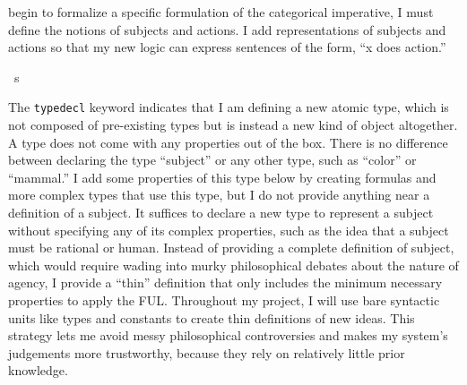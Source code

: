 \begin{isabellebody}
\begin{isamarkuptext}
begin to formalize a specific formulation of the categorical imperative, I must define the notions of 
subjects and actions. I add representations of subjects and actions so that my new logic can express
sentences of the form, ``x does action.''%
\end{isamarkuptext}\isamarkuptrue%
\isamarkupfalse%
\ s\ %
%
\begin{isamarkuptext}%
The \texttt{typedecl} keyword indicates that I am defining a new atomic type, which is not composed
of pre-existing types but is instead a new kind of object altogether. A type does not come with any 
properties out of the box. There is no difference between declaring the type ``subject'' or any other
type, such as ``color'' or ``mammal.'' I add some properties of this type below by creating formulas
and more complex types that use this type, but I do not provide anything near a definition of a subject.
It suffices to declare a new type to represent a subject without specifying any of its complex properties, 
such as the idea that a subject must be rational or human. Instead of providing a complete definition of subject, 
which would require wading into murky philosophical debates about the nature of agency, I provide a 
``thin'' definition that only includes the minimum necessary properties to apply the FUL. Throughout my 
project, I will use bare syntactic units like types and constants to create thin definitions of new ideas.
This strategy lets me avoid messy philosophical controversies and makes my system's judgements more 
trustworthy, because they rely on relatively little prior knowledge.


\end{isamarkuptext}
\end{isabellebody}
